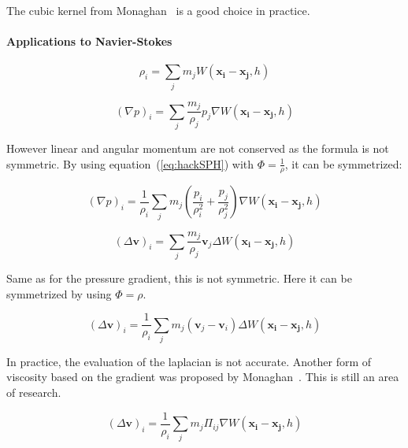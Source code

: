 The cubic kernel from Monaghan~\cite{Monaghan2005} is a good choice in practice.

\paragraph{Applications to Navier-Stokes}

\begin{equation}
\label{eq:densitySPH}
\rho_{i} = \sum_{j} m_{j}W(\mathbf{x_{i}}-\mathbf{x_{j}},h)
\end{equation}

\begin{equation}
\left(\nabla p\right)_{i} = \sum_{j} \frac{m_{j}}{\rho_{j}} p_{j} \nabla W(\mathbf{x_{i}}-\mathbf{x_{j}},h)
\end{equation}

However linear and angular momentum are not conserved as the formula is not symmetric. By using equation~(\ref{eq:hackSPH}) with $\displaystyle \Phi = \frac{1}{\rho}$, it can be symmetrized:

\begin{equation}
\label{eq:pressureGradientSPH}
\left(\nabla p\right)_{i} = 
\frac{1}{\rho_{i}}
\sum_{j} m_{j} \left( \frac{p_{i}}{\rho_{i}^{2}} + \frac{p_{j}}{\rho_{j}^{2}} \right) \nabla W(\mathbf{x_{i}}-\mathbf{x_{j}},h)
\end{equation}

\begin{equation}
\left(\Delta \mathbf{v}\right)_{i} = \sum_{j} \frac{m_{j}}{\rho_{j}} \mathbf{v}_{j} \Delta W(\mathbf{x_{i}}-\mathbf{x_{j}},h)
\end{equation}

Same as for the pressure gradient, this is not symmetric. Here it can be symmetrized by using $\Phi = \rho$.

\begin{equation}
\left(\Delta \mathbf{v}\right)_{i} = \frac{1}{\rho_{i}}\sum_{j} m_{j} \left( \mathbf{v}_{j}-\mathbf{v}_{i}\right) \Delta W(\mathbf{x_{i}}-\mathbf{x_{j}},h)
\end{equation}

In practice, the evaluation of the laplacian is not accurate. Another form of viscosity based on the gradient was proposed by Monaghan~\cite{Monaghan2005}. This is still an area of research.

\begin{equation}
\label{eq:velocityLaplacianSPH}
\left(\Delta \mathbf{v}\right)_{i} = 
\frac{1}{\rho_{i}}
\sum_{j} m_{j} \Pi_{ij} \nabla W(\mathbf{x_{i}}-\mathbf{x_{j}},h)
\end{equation}

